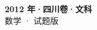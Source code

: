 \documentclass[zihao=-4, a4paper]{ctexart}
\begin{document}
\begin{center}
  {\Large\bfseries 2012 年·四川卷·文科}\\[4pt]
  {\large 数学 · 试题版}
\end{center}
\medskip
{}

\end{document}
